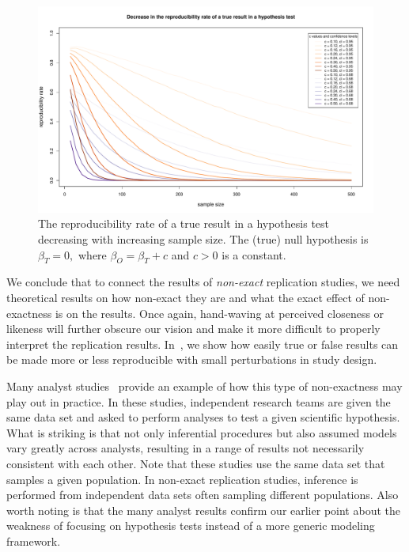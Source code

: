 \documentclass[meta,authordate,issue]{jote-new-article}
\newcounter{result}
\begin{document}
\begin{figure}[b]
  \begin{fullwidth}
    \centering
    \includegraphics[width=\textwidth]{Figure_1.pdf}
    \caption{The reproducibility rate of a true result in a hypothesis test decreasing with increasing sample size. The (true) null hypothesis is $\beta_{T}=0,$ where $\beta_{O}=\beta_{T}+c$ and $c>0$  is a constant.}
    \label{fig:samplesize}
  \end{fullwidth}
\end{figure}


We conclude that to connect the results of {\em non-exact} replication studies, we need theoretical results on how non-exact they are and what the exact effect of non-exactness is on the results. Once again, hand-waving at perceived closeness or likeness will further obscure our vision and make it more difficult to properly interpret the replication results. In~\textcite{Buzbas2023}, we show how easily true or false results can be made more or less reproducible with small perturbations in study design.

Many analyst studies~\parencites[e.g.,][]{breznau2022observing}{hoogeveen2022many}{Silberzahn2018} provide an example of how this type of non-exactness may play out in practice. In these studies, independent research teams are given the same data set and asked to perform analyses to test a given scientific hypothesis. What is striking is that not only inferential procedures but also assumed models vary greatly across analysts, resulting in a range of results not necessarily consistent with each other. Note that these studies use the same data set that samples a given population. In non-exact replication studies, inference is performed from independent data sets often sampling different populations. Also worth noting is that the many analyst results confirm our earlier point about the weakness of focusing on hypothesis tests instead of a more generic modeling framework.
\end{document}
